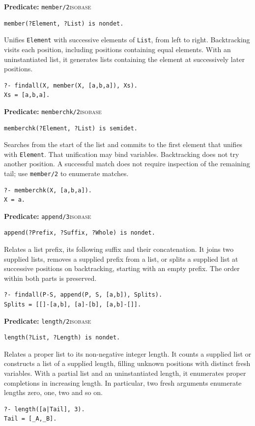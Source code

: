 \noindent \textbf{Predicate:} \texttt{member/2}\hfill\textsc{isobase}
\begin{verbatim}
member(?Element, ?List) is nondet.
\end{verbatim}
\noindent Unifies \texttt{Element} with successive elements of \texttt{List},
from left to right. Backtracking visits each position, including positions
containing equal elements. With an uninstantiated list, it generates lists
containing the element at successively later positions.
\begin{verbatim}
?- findall(X, member(X, [a,b,a]), Xs).
Xs = [a,b,a].
\end{verbatim}

\par{}
\noindent \textbf{Predicate:} \texttt{memberchk/2}\hfill\textsc{isobase}
\begin{verbatim}
memberchk(?Element, ?List) is semidet.
\end{verbatim}
\noindent Searches from the start of the list and commits to the first element
that unifies with \texttt{Element}. That unification may bind variables.
Backtracking does not try another position. A successful match does not require
inspection of the remaining tail; use \texttt{member/2} to enumerate matches.
\begin{verbatim}
?- memberchk(X, [a,b,a]).
X = a.
\end{verbatim}

\par{}
\noindent \textbf{Predicate:} \texttt{append/3}\hfill\textsc{isobase}
\begin{verbatim}
append(?Prefix, ?Suffix, ?Whole) is nondet.
\end{verbatim}
\noindent Relates a list prefix, its following suffix and their concatenation.
It joins two supplied lists, removes a supplied prefix from a list, or splits a
supplied list at successive positions on backtracking, starting with an empty
prefix. The order within both parts is preserved.
\begin{verbatim}
?- findall(P-S, append(P, S, [a,b]), Splits).
Splits = [[]-[a,b], [a]-[b], [a,b]-[]].
\end{verbatim}

\par{}
\noindent \textbf{Predicate:} \texttt{length/2}\hfill\textsc{isobase}
\begin{verbatim}
length(?List, ?Length) is nondet.
\end{verbatim}
\noindent Relates a proper list to its non-negative integer length. It counts a
supplied list or constructs a list of a supplied length, filling unknown
positions with distinct fresh variables. With a partial list and an
uninstantiated length, it enumerates proper completions in increasing length.
In particular, two fresh arguments enumerate lengths zero, one, two and so on.
\begin{verbatim}
?- length([a|Tail], 3).
Tail = [_A,_B].
\end{verbatim}

